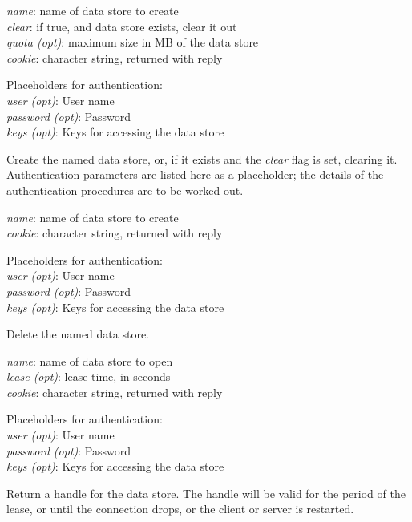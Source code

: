 {
\metP
    {\em name}: name of data store to create\\
    {\em clear}: if true, and data store exists, clear it out\\
    {\em quota (opt)}: maximum size in MB of the data store\\
    {\em cookie}: character string, returned with reply

    Placeholders for authentication:\\
    {\em user (opt)}: User name\\
    {\em password (opt)}: Password\\
    {\em keys (opt)}: Keys for accessing the data store

\metD
    Create the named data store, or, if it exists and the {\em clear}
    flag is set, clearing it.  Authentication parameters are listed
    here as a placeholder; the details of the authentication procedures
    are to be worked out.

}

{
\metP
    {\em name}: name of data store to create\\
    {\em cookie}: character string, returned with reply

    Placeholders for authentication:\\
    {\em user (opt)}: User name\\
    {\em password (opt)}: Password\\
    {\em keys (opt)}: Keys for accessing the data store

\metD
    Delete the named data store.
}

{
\metP
    {\em name}: name of data store to open\\
    {\em lease (opt)}: lease time, in seconds\\
    {\em cookie}: character string, returned with reply

    Placeholders for authentication:\\
    {\em user (opt)}: User name\\
    {\em password (opt)}: Password\\
    {\em keys (opt)}: Keys for accessing the data store


\metD 

Return a handle for the data store. The handle will be valid for the period of
the lease, or until the connection drops, or the client or server is restarted. 
}

